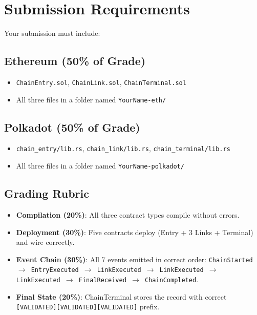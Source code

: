 \documentclass[11pt,a4paper]{article}
\begin{document}
\section{Submission Requirements}

Your submission must include:

\subsection{Ethereum (50\% of Grade)}
\begin{itemize}
    \item \texttt{ChainEntry.sol}, \texttt{ChainLink.sol}, \texttt{ChainTerminal.sol}
    \item All three files in a folder named \texttt{YourName-eth/}
\end{itemize}

\subsection{Polkadot (50\% of Grade)}
\begin{itemize}
    \item \texttt{chain\_entry/lib.rs}, \texttt{chain\_link/lib.rs}, \texttt{chain\_terminal/lib.rs}
    \item All three files in a folder named \texttt{YourName-polkadot/}
\end{itemize}

\subsection{Grading Rubric}

\begin{itemize}
    \item \textbf{Compilation (20\%)}: All three contract types compile without errors.
    \item \textbf{Deployment (30\%)}: Five contracts deploy (Entry + 3 Links + Terminal) and wire correctly.
    \item \textbf{Event Chain (30\%)}: All 7 events emitted in correct order:
          \texttt{ChainStarted $\to$ EntryExecuted $\to$ LinkExecuted $\to$ LinkExecuted $\to$ LinkExecuted $\to$ FinalReceived $\to$ ChainCompleted}.
    \item \textbf{Final State (20\%)}: ChainTerminal stores the record with correct
          \texttt{[VALIDATED][VALIDATED][VALIDATED]} prefix.
\end{itemize}
\end{document}
